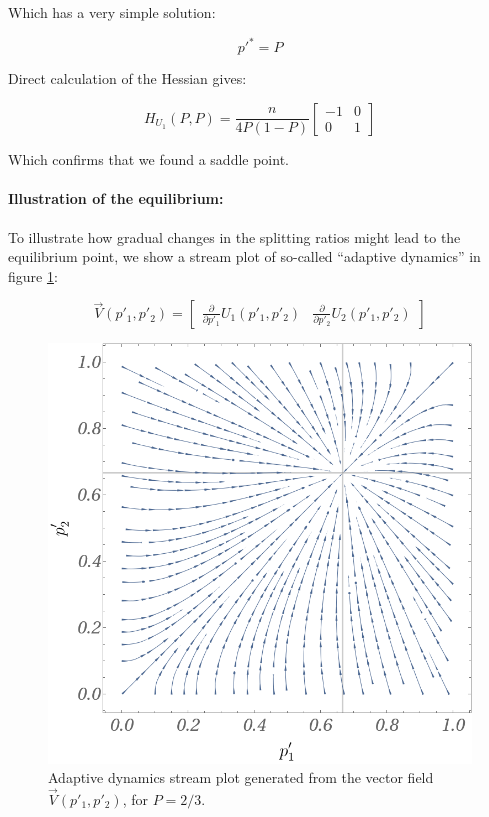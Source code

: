 \documentclass{article}
\theoremstyle{definition}
\begin{document}
Which has a very simple solution:

\begin{equation}
\boxed{
    p'^* = P
    }
\end{equation}

Direct calculation of the Hessian gives:

\begin{equation}
    H_{U_1}(P,P) = \frac{n}{4 P (1-P)}
    \begin{bmatrix}
-1 & 0 \\
0 & 1
\end{bmatrix}
\end{equation}

Which confirms that we found a saddle point.

\paragraph{Illustration of the equilibrium:}

To illustrate how gradual changes in the splitting ratios might lead to the equilibrium point, we show a stream plot of so-called ``adaptive dynamics'' \cite{paper:AdaptiveDynamics} in figure \ref{fig:AdaptiveDynamics0}:

\begin{equation}
    \overrightarrow{V}(p'_1,p'_2) = 
    \begin{bmatrix}
    \frac{\partial}{\partial p'_1} U_1(p'_1,p'_2) &
    \frac{\partial}{\partial p'_2} U_2(p'_1,p'_2)
    \end{bmatrix}
\end{equation}

\begin{figure}[H]
    \centering
    \includegraphics[width=12 cm]{img/Contest_Vp1p2.png}
    \caption{Adaptive dynamics stream plot generated from the vector field $\overrightarrow{V}(p'_1,p'_2)$, for $P=2/3$.}
    \label{fig:AdaptiveDynamics0}
\end{figure}
\end{document}
